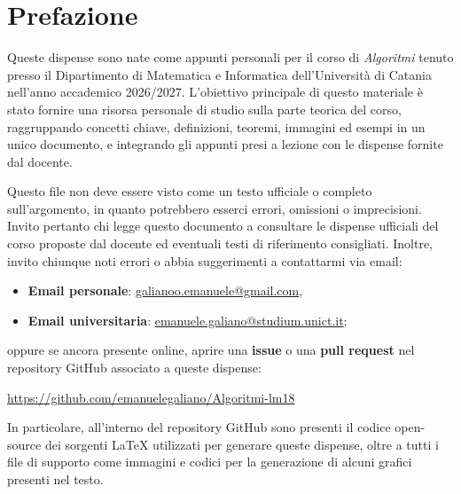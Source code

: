 \chapter*{Prefazione}

\setlength{\parskip}{0.8em}
\setlength{\parindent}{0pt}

Queste dispense sono nate come appunti personali per il corso di \emph{Algoritmi} tenuto presso il Dipartimento di Matematica e Informatica dell'Universit\`a di Catania nell'anno accademico 2026/2027. L'obiettivo principale di questo materiale è stato fornire una risorsa personale di studio sulla parte teorica del corso, raggruppando concetti chiave, definizioni, teoremi, immagini ed esempi in un unico documento, e integrando gli appunti presi a lezione con le dispense fornite dal docente.

Questo file non deve essere visto come un testo ufficiale o completo sull'argomento, in quanto potrebbero esserci errori, omissioni o imprecisioni. Invito pertanto chi legge questo documento a consultare le dispense ufficiali del corso proposte dal docente ed eventuali testi di riferimento consigliati. Inoltre, invito chiunque noti errori o abbia suggerimenti a contattarmi via email:
\begin{itemize}
    \item \textbf{Email personale}: \href{mailto:galianoo.emanuele@gmail.com}{galianoo.emanuele@gmail.com},
    \item \textbf{Email universitaria}: \href{mailto:emanuele.galiano@studium.unict.it}{emanuele.galiano@studium.unict.it};
\end{itemize}

\noindent
oppure se ancora presente online, aprire una \textbf{issue} o una \textbf{pull request} nel repository GitHub associato a queste dispense:
\begin{center}
\begin{minipage}{0.92\textwidth}
\centering
\url{https://github.com/emanuelegaliano/Algoritmi-lm18}
\end{minipage}
\end{center}

In particolare, all'interno del repository GitHub sono presenti il codice open-source dei sorgenti \LaTeX{} utilizzati per generare queste dispense, oltre a tutti i file di supporto come immagini e codici per la generazione di alcuni grafici presenti nel testo.

